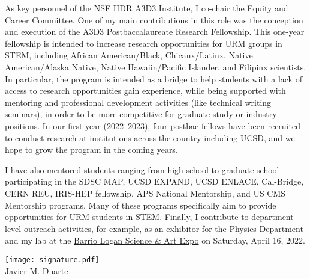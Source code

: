 \documentclass[11pt,letterpaper,notitlepage]{article}
\begin{document}
As key personnel of the NSF HDR A3D3 Institute, I co-chair the Equity and Career Committee.
One of my main contributions in this role was the conception and execution of the A3D3 Postbaccalaureate Research Fellowship.
This one-year fellowship is intended to increase research opportunities for URM groups in STEM, including African American/Black, Chicanx/Latinx, Native American/Alaska Native, Native Hawaiin/Pacific Islander, and Filipinx scientists.
In particular, the program is intended as a bridge to help students with a lack of access to research opportunities gain experience, while being supported with mentoring and professional development activities (like technical writing seminars), in order to be more competitive for graduate study or industry positions.
In our first year (2022--2023), four postbac fellows have been recruited to conduct research at institutions across the country including UCSD, and we hope to grow the program in the coming years.

I have also mentored students ranging from high school to graduate school participating in the SDSC MAP, UCSD EXPAND, UCSD ENLACE, Cal-Bridge, CERN REU, IRIS-HEP fellowship, APS National Mentorship, and US CMS Mentorship programs.
Many of these programs specifically aim to provide opportunities for URM students in STEM.
Finally, I contribute to department-level outreach activities, for example, as an exhibitor for the Physics Department and my lab at the \href{https://www.barriologansae.com/}{Barrio Logan Science \& Art Expo} on Saturday, April 16, 2022.

\vspace{0.1in}
\texttt{[image: signature.pdf]}\\
\indent\indent Javier M. Duarte
\end{document}
